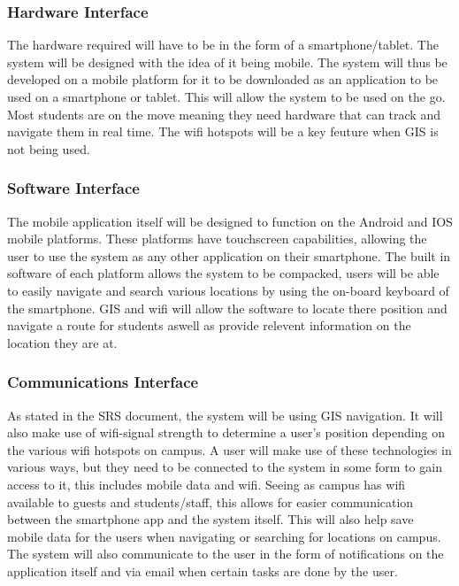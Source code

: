 \documentclass{article}
\begin{document}
		\subsubsection{Hardware Interface}
The hardware required will have to be in the form of a smartphone/tablet. The system will be designed with the idea of it being mobile. The system will thus be developed on a mobile platform for it to be downloaded as an application to be used on a smartphone or tablet. This will allow the system to be used on the go. Most students are on the move meaning they need hardware that can track and navigate them in real time. The wifi hotspots will be a key feuture when GIS is not being used.

		\subsubsection{Software Interface}
The mobile application itself will be designed to function on the Android and IOS mobile platforms. These platforms have touchscreen capabilities, allowing the user to use the system as any other application on their smartphone. The built in software of each platform allows the system to be compacked, users will be able to easily navigate and search various locations by using the on-board keyboard of the smartphone. GIS and wifi will allow the software to locate there position and navigate a route for students aswell as provide relevent information on the location they are at.

		\subsubsection{Communications Interface}
As stated in the SRS document, the system will be using GIS navigation. It will also make use of wifi-signal strength to determine a user's position depending on the various wifi hotspots on campus. A user will make use of these technologies in various ways, but they need to be connected to the system in some form to gain access to it, this includes mobile data and wifi. Seeing as campus has wifi available to guests and students/staff, this allows for easier communication between the smartphone app and the system itself. This will also help save mobile data for the users when navigating or searching for locations on campus. The system will also communicate to the user in the form of notifications on the application itself and via email when certain tasks are done by the user.
\end{document}
